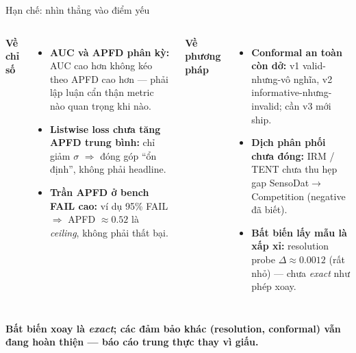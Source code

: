 \documentclass[aspectratio=169,10pt]{beamer}
\newcommand{\takeaway}[1]{%
  \vspace{0.3em}%
  \begin{mdframed}[linecolor=mLightBrown,linewidth=1.2pt,
    backgroundcolor=mLightBrown!8,
    innertopmargin=4pt,innerbottommargin=4pt,
    innerleftmargin=8pt,innerrightmargin=8pt,roundcorner=2pt]
  \centering\footnotesize\bfseries\color{mDarkTeal} #1
  \end{mdframed}}
\begin{document}
\begin{frame}{Hạn chế: nhìn thẳng vào điểm yếu}
\begin{columns}[T,onlytextwidth]
\scriptsize
\textbf{\color{navydeep}Về chỉ số}
\begin{itemize}\setlength{\itemsep}{0.4em}
  \item \textcolor{alert!80!black}{\textbf{AUC và APFD phân kỳ:}} AUC cao hơn không kéo theo APFD cao hơn — phải lập luận cẩn thận metric nào quan trọng khi nào.
  \item \textcolor{alert!80!black}{\textbf{Listwise loss chưa tăng APFD trung bình:}} chỉ giảm $\sigma$ $\Rightarrow$ đóng góp ``ổn định'', không phải headline.
  \item \textcolor{alert!80!black}{\textbf{Trần APFD ở bench FAIL cao:}} ví dụ 95\% FAIL $\Rightarrow$ APFD $\approx 0.52$ là \emph{ceiling}, không phải thất bại.
\end{itemize}

\scriptsize
\textbf{\color{navydeep}Về phương pháp}
\begin{itemize}\setlength{\itemsep}{0.4em}
  \item \textcolor{alert!80!black}{\textbf{Conformal an toàn còn dở:}} v1 valid-nhưng-vô nghĩa, v2 informative-nhưng-invalid; cần v3 mới ship.
  \item \textcolor{alert!80!black}{\textbf{Dịch phân phối chưa đóng:}} IRM / TENT chưa thu hẹp gap SensoDat$\to$Competition (negative đã biết).
  \item \textcolor{alert!80!black}{\textbf{Bất biến lấy mẫu là xấp xỉ:}} resolution probe $\Delta\!\approx\!0.0012$ (rất nhỏ) — chưa \emph{exact} như phép xoay.
\end{itemize}
\end{columns}

\takeaway{Bất biến xoay là \emph{exact}; các đảm bảo khác (resolution, conformal) vẫn đang hoàn thiện — báo cáo trung thực thay vì giấu.}
\end{frame}
\end{document}
